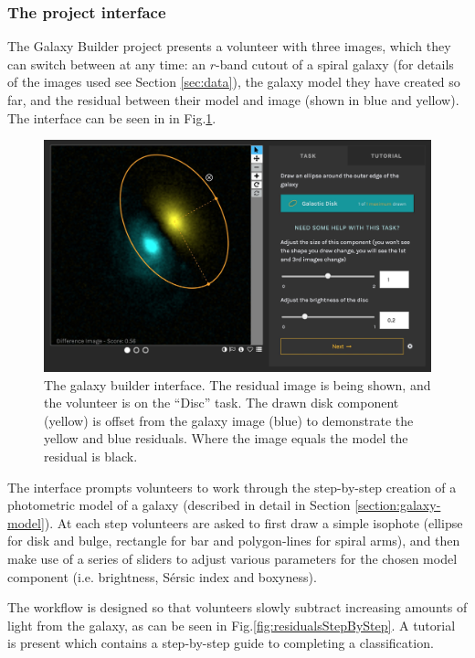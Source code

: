 \documentclass[../main.tex]{subfiles}
\begin{document}
\subsubsection{The project interface}

The Galaxy Builder project presents a volunteer with three images, which they can switch between at any time: an $r$-band cutout of a spiral galaxy (for details of the images used see Section \ref{sec:data}), the galaxy model they have created so far, and the residual between their model and image (shown in blue and yellow). The interface can be seen in in Fig.\ref{fig:interfaceInProgress}.

\begin{figure}
  \includegraphics[width=17.7cm]{images/interfaceInProgress.jpg}
  \caption{The galaxy builder interface. The residual image is being shown, and the volunteer is on the ``Disc'' task. The drawn disk component (yellow) is offset from the galaxy image (blue) to demonstrate the yellow and blue residuals. Where the image equals the model the residual is black.}
  \label{fig:interfaceInProgress}
\end{figure}

The interface prompts volunteers to work through the step-by-step creation of a photometric model of a galaxy (described in detail in Section \ref{section:galaxy-model}). At each step volunteers are asked to first draw a simple isophote (ellipse for disk and bulge, rectangle for bar and polygon-lines for spiral arms), and then make use of a series of sliders to adjust various parameters for the chosen model component (i.e. brightness, S\'ersic index and boxyness).

The workflow is designed so that volunteers slowly subtract increasing amounts of light from the galaxy, as can be seen in Fig.\ref{fig:residualsStepByStep}. A tutorial is present which contains a step-by-step guide to completing a classification.
\end{document}
